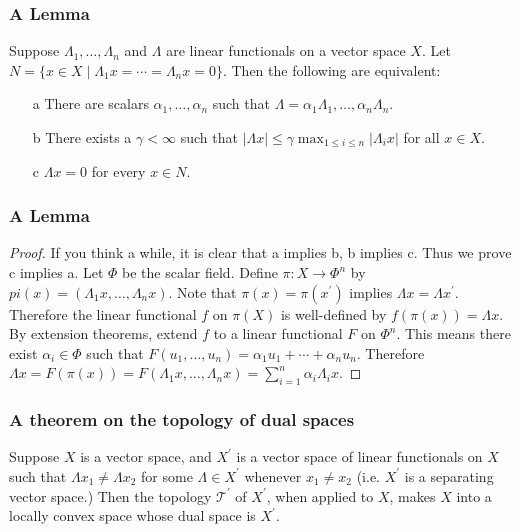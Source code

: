 \documentclass{beamer}
\begin{document}
\begin{frame}
\frametitle{A Lemma}
\begin{lemma}
    Suppose $\Lambda_1,\ldots,\Lambda_n$ and $\Lambda$ are linear functionals on a vector space $X$. Let $N = \{x \in X \mid \Lambda_1 x = \cdots = \Lambda_n x = 0\}$. Then the following are equivalent:\begin{itemize}
        \item[a] There are scalars $\alpha_1,\ldots,\alpha_n$ such that $\Lambda = \alpha_1\Lambda_1,\ldots,\alpha_n\Lambda_n$.
        \item[b] There exists a $\gamma < \infty$ such that $|\Lambda x| \leq \gamma \max_{1\leq i\leq n}|\Lambda_i x|$ for all $x \in X$.
        \item[c] $\Lambda x = 0$ for every $x \in N$.
    \end{itemize}
\end{lemma}
\end{frame}
\begin{frame}
\frametitle{A Lemma}
\begin{proof}
    If you think a while, it is clear that a implies b, b implies c. Thus we prove c implies a. Let $\Phi$ be the scalar field. Define $\pi : X \to \Phi^n$ by $pi(x) = (\Lambda_1 x, \ldots, \Lambda_n x)$. Note that $\pi(x) = \pi(x^\prime)$ implies $\Lambda x = \Lambda x^\prime$. Therefore the linear functional $f$ on $\pi(X)$ is well-defined by $f(\pi(x)) = \Lambda x$. By extension theorems, extend $f$ to a linear functional $F$ on $\Phi^n$. This means there exist $\alpha_i \in \Phi$ such that $F(u_1,\ldots,u_n) = \alpha_1 u_1 + \cdots + \alpha_n u_n$. Therefore $\Lambda x = F(\pi(x)) = F(\Lambda_1 x ,\ldots, \Lambda_n x) = \sum_{i=1}^n \alpha_i \Lambda_i x$.
\end{proof}
\end{frame}
\begin{frame}
\frametitle{A theorem on the topology of dual spaces}
\begin{theorem}
    Suppose $X$ is a vector space, and $X^\prime$ is a vector space of linear functionals on $X$ such that $\Lambda x_1 \neq \Lambda x_2$ for some $\Lambda \in X^\prime$ whenever $x_1\neq x_2$ (i.e. $X^\prime$ is a separating vector space.) Then the topology $\mathcal{T}^\prime$ of $X^\prime$, when applied to $X$, makes $X$ into a locally convex space whose dual space is $X^\prime$.
\end{theorem}
\end{frame}
\end{document}
